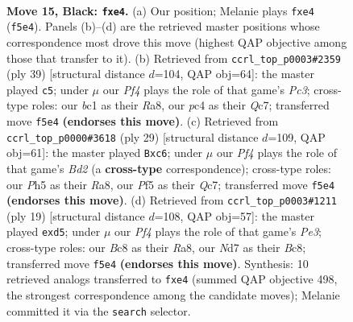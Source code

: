 \documentclass[11pt]{article}
\begin{document}
\clearpage

\begin{figure}[p]\centering
\begin{subfigure}{0.46\textwidth}\centering
\resizebox{\linewidth}{!}{%
\newchessgame
\chessboard[
  setfen={1rb1qrk1/pp1n1pb1/2pp4/1P3p1p/P1PNN2P/6P1/6B1/R1BQK2R b KQ - 0 15},
  showmover=false,
  pgfstyle=straightmove, color=movearrow, markmove={f5-e4}
]}
\caption{}
\end{subfigure}\hfill
\begin{subfigure}{0.46\textwidth}\centering
\resizebox{\linewidth}{!}{%
\newchessgame
\chessboard[
  setfen={r2r2k1/1bqn1pbp/2p3p1/p2P4/P2Np2P/2R1P3/3NBPP1/3Q1RK1 b - - 1 20},
  showmover=false,
  pgfstyle=straightmove, color=movearrow, markmove={c6-c5}
]}
\caption{}
\end{subfigure}
\\[4pt]
\begin{subfigure}{0.46\textwidth}\centering
\resizebox{\linewidth}{!}{%
\newchessgame
\chessboard[
  setfen={r4rk1/1pqbbpp1/p1N2n2/P2p3p/8/2N1BP2/1PPQB1PP/R4R1K b - - 0 15},
  showmover=false,
  pgfstyle=straightmove, color=movearrow, markmove={d7-c6}
]}
\caption{}
\end{subfigure}\hfill
\begin{subfigure}{0.46\textwidth}\centering
\resizebox{\linewidth}{!}{%
\newchessgame
\chessboard[
  setfen={r1bq1rk1/pp2bppp/n3p3/2PNN3/2p2B2/6P1/PP2PPBP/R2QK2R b KQ - 0 10},
  showmover=false,
  pgfstyle=straightmove, color=movearrow, markmove={e6-d5}
]}
\caption{}
\end{subfigure}
\caption{\textbf{Move 15, Black: \texttt{fxe4}.} (a) Our position; Melanie plays \texttt{fxe4} (\texttt{f5e4}). Panels (b)--(d) are the retrieved master positions whose correspondence most drove this move (highest QAP objective among those that transfer to it). (b) Retrieved from \texttt{ccrl\_top\_p0003\#2359} (ply 39) [structural distance $d$=104, QAP obj=64]: the master played \texttt{c5}; under $\mu$ our \emph{Pf4} plays the role of that game's \emph{Pc3}; cross-type roles: our \emph{b}c1 as their \emph{R}a8, our \emph{p}c4 as their \emph{Q}c7; transferred move \texttt{f5e4} \textbf{(endorses this move)}. (c) Retrieved from \texttt{ccrl\_top\_p0000\#3618} (ply 29) [structural distance $d$=109, QAP obj=61]: the master played \texttt{Bxc6}; under $\mu$ our \emph{Pf4} plays the role of that game's \emph{Bd2} (a \textbf{cross-type} correspondence); cross-type roles: our \emph{P}h5 as their \emph{R}a8, our \emph{P}f5 as their \emph{Q}c7; transferred move \texttt{f5e4} \textbf{(endorses this move)}. (d) Retrieved from \texttt{ccrl\_top\_p0003\#1211} (ply 19) [structural distance $d$=108, QAP obj=57]: the master played \texttt{exd5}; under $\mu$ our \emph{Pf4} plays the role of that game's \emph{Pe3}; cross-type roles: our \emph{B}c8 as their \emph{R}a8, our \emph{N}d7 as their \emph{B}c8; transferred move \texttt{f5e4} \textbf{(endorses this move)}. Synthesis: 10 retrieved analogs transferred to \texttt{fxe4} (summed QAP objective 498, the strongest correspondence among the candidate moves); Melanie committed it via the \texttt{search} selector.}
\label{fig:thought-m29}
\end{figure}
\end{document}
